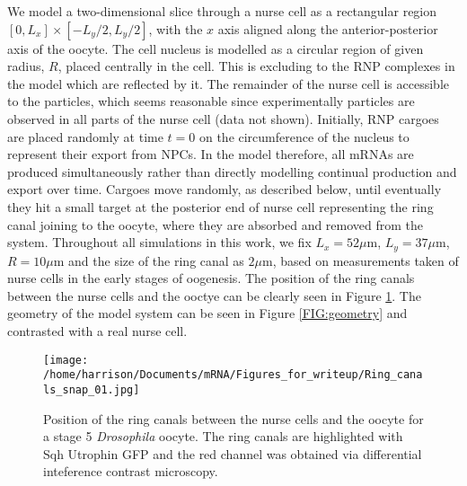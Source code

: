 \documentclass[twocolumn]{biophys}
\begin{document}
We model a two-dimensional slice through a nurse cell as a rectangular region $[0,L_x] \times [-L_y/2, L_y/2]$, with the $x$ axis aligned along the anterior-posterior axis of the oocyte.
The cell nucleus is modelled as a circular region of given radius, $R$, placed centrally in the cell. 
This is excluding to the RNP complexes in the model which are reflected by it.
The remainder of the nurse cell is accessible to the particles, which seems reasonable since experimentally particles are observed in all parts of the nurse cell (data not shown).
Initially, RNP cargoes are placed randomly at time $t=0$ on the circumference of the nucleus to represent their export from NPCs.
In the model therefore, all mRNAs are produced simultaneously rather than directly modelling continual production and export over time.
Cargoes move randomly, as described below, until eventually they hit a small target at the posterior end of nurse cell representing the ring canal joining to the oocyte, where they are absorbed and removed from the system.
Throughout all simulations in this work, we fix $L_x=52 \mu \text{m}$, $L_y=37 \mu \text{m}$, $R=10 \mu \text{m}$ and the size of the ring canal as $2\mu \text{m}$, based on measurements taken of nurse cells in the early stages of oogenesis.
The position of the ring canals between the nurse cells and the ooctye can be clearly seen in Figure \ref{FIG:ring_canals}.
The geometry of the model system can be seen in Figure \ref{FIG:geometry} and contrasted with a real nurse cell.
\begin{figure}[h]
 \centering
 \texttt{[image: /home/harrison/Documents/mRNA/Figures\_for\_writeup/Ring\_canals\_snap\_01.jpg]}
 \caption{\small Position of the ring canals between the nurse cells and the oocyte for a stage 5 \textit{Drosophila} oocyte. The ring canals are highlighted with Sqh Utrophin GFP and the red channel was obtained via differential inteference contrast microscopy.}
 \label{FIG:ring_canals}
\end{figure}
\end{document}
